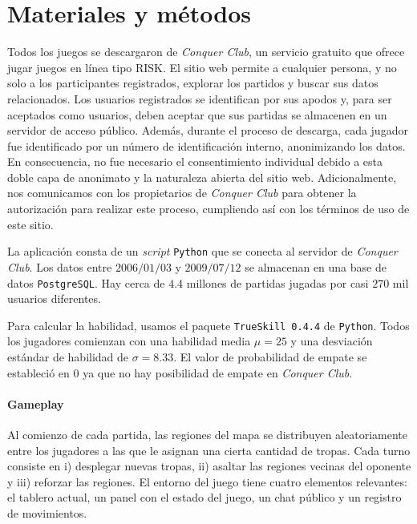 \documentclass[a4paper,11pt]{book}
\theoremstyle{definition}
\begin{document}
\section{Materiales y m\'etodos}

Todos los juegos se descargaron de \emph{Conquer Club}, un servicio gratuito que ofrece jugar juegos en l\'inea tipo RISK.
%
El sitio web permite a cualquier persona, y no solo a los participantes registrados, explorar los partidos y buscar sus datos relacionados.
%
Los usuarios registrados se identifican por sus apodos y, para ser aceptados como usuarios, deben aceptar que sus partidas se almacenen en un servidor de acceso p\'ublico.
%
Adem\'as, durante el proceso de descarga, cada jugador fue identificado por un n\'umero de identificaci\'on interno, anonimizando los datos.
%
En consecuencia, no fue necesario el consentimiento individual debido a esta doble capa de anonimato y la naturaleza abierta del sitio web.
%
Adicionalmente, nos comunicamos con los propietarios de \emph{Conquer Club} para obtener la autorizaci\'on para realizar este proceso, cumpliendo as\'i con los t\'erminos de uso de este sitio.


La aplicaci\'on consta de un \emph{script} \texttt{Python} que se conecta al servidor de \emph{Conquer Club}.
%
Los datos entre $2006/01/03$ y $2009/07/12$ se almacenan en una base de datos \texttt{PostgreSQL}.
Hay cerca de $4.4$ millones de partidas jugadas por casi $270$ mil usuarios diferentes.

Para calcular la habilidad, usamos el paquete \texttt{TrueSkill 0.4.4} de \texttt{Python}.
%
Todos los jugadores comienzan con una habilidad media $\mu = 25$ y una desviaci\'on est\'andar de habilidad de $\sigma = 8.33$.
%
El valor de probabilidad de empate se estableci\'o en 0 ya que no hay posibilidad de empate en \emph{Conquer Club}.


\paragraph{Gameplay}\label{sub:gameplay}



Al comienzo de cada partida, las regiones del mapa se distribuyen aleatoriamente entre los jugadores a las que le asignan una cierta cantidad de tropas.
%
Cada turno consiste en i) desplegar nuevas tropas, ii) asaltar las regiones vecinas del oponente y iii) reforzar las regiones.
%
El entorno del juego tiene cuatro elementos relevantes: el tablero actual, un panel con el estado del juego, un chat p\'ublico y un registro de movimientos.
\end{document}
